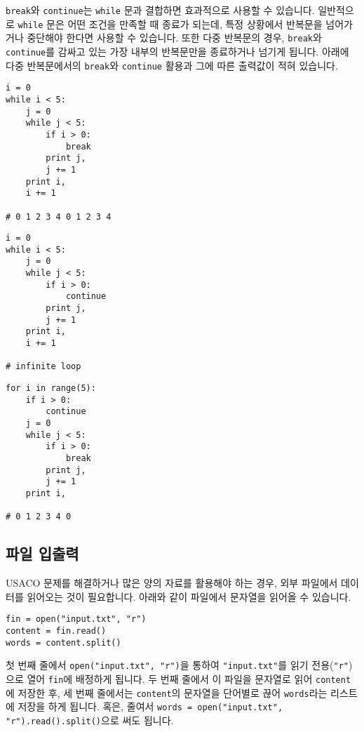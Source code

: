 \documentclass[../main.tex]{subfiles}
\begin{document}
\texttt{break}와 \texttt{continue}는 \texttt{while} 문과 결합하면 효과적으로 사용할 수 있습니다.
일반적으로 \texttt{while} 문은 어떤 조건을 만족할 때 종료가 되는데, 특정 상황에서 반복문을 넘어가거나 중단해야 한다면 사용할 수 있습니다.
또한 다중 반복문의 경우, \texttt{break}와 \texttt{continue}를 감싸고 있는 가장 내부의 반복문만을 종료하거나 넘기게 됩니다.
아래에 다중 반복문에서의 \texttt{break}와 \texttt{continue} 활용과 그에 따른 출력값이 적혀 있습니다.
\begin{verbatim}
i = 0
while i < 5:
    j = 0
    while j < 5:
        if i > 0:
            break
        print j,
        j += 1
    print i,
    i += 1

# 0 1 2 3 4 0 1 2 3 4
\end{verbatim}
\begin{verbatim}
i = 0
while i < 5:
    j = 0
    while j < 5:
        if i > 0:
            continue
        print j,
        j += 1
    print i,
    i += 1

# infinite loop
\end{verbatim}
\begin{verbatim}
for i in range(5):
    if i > 0:
        continue
    j = 0
    while j < 5:
        if i > 0:
            break
        print j,
        j += 1
    print i,

# 0 1 2 3 4 0
\end{verbatim}

\subsection{파일 입출력}
USACO 문제를 해결하거나 많은 양의 자료를 활용해야 하는 경우, 외부 파일에서 데이터를 읽어오는 것이 필요합니다.
아래와 같이 파일에서 문자열을 읽어올 수 있습니다.
\begin{verbatim}
fin = open("input.txt", "r")
content = fin.read()
words = content.split()
\end{verbatim}
첫 번째 줄에서 \texttt{open("input.txt", "r")}을 통하여 \texttt{"input.txt"}를 읽기 전용(\texttt{"r"})으로 열어 \texttt{fin}에 배정하게 됩니다.
두 번째 줄에서 이 파일을 문자열로 읽어 \texttt{content}에 저장한 후, 세 번째 줄에서는 \texttt{content}의 문자열을 단어별로 끊어 \texttt{words}라는 리스트에 저장을 하게 됩니다.
혹은, 줄여서 \texttt{words = open("input.txt", "r").read().split()}으로 써도 됩니다.
\end{document}
